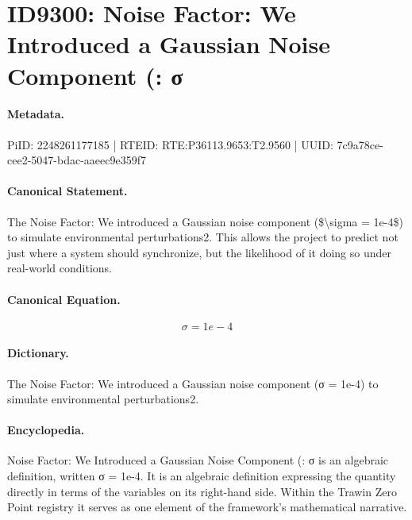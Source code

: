 \section*{ID9300: Noise Factor: We Introduced a Gaussian Noise Component (: σ}
\paragraph{Metadata.}
PiID: 2248261177185 | RTEID: RTE:P36113.9653:T2.9560 | UUID: 7c9a78ce-cee2-5047-bdac-aaeec9e359f7

\paragraph{Canonical Statement.}
The Noise Factor: We introduced a Gaussian noise component (\$\textbackslash{}sigma = 1e-4\$) to simulate environmental perturbations2. This allows the project to predict not just where a system should synchronize, but the likelihood of it doing so under real-world conditions.

\paragraph{Canonical Equation.}
\[
\sigma = 1e-4
\]

\paragraph{Dictionary.}
The Noise Factor: We introduced a Gaussian noise component (σ = 1e-4) to simulate environmental perturbations2.

\paragraph{Encyclopedia.}
Noise Factor: We Introduced a Gaussian Noise Component (: σ is an algebraic definition, written σ = 1e-4. It is an algebraic definition expressing the quantity directly in terms of the variables on its right-hand side. Within the Trawin Zero Point registry it serves as one element of the framework's mathematical narrative.
